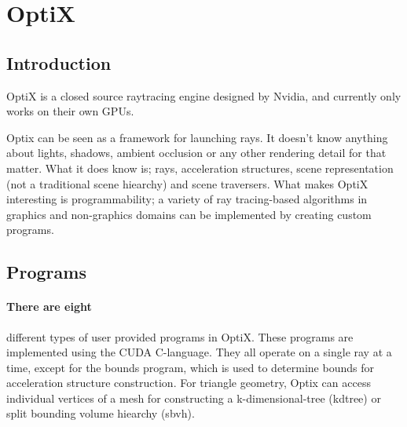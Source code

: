 \section{OptiX}

\subsection{Introduction}
OptiX is a closed source raytracing engine designed by Nvidia, and currently only works on their own GPUs.

Optix can be seen as a framework for launching rays. It doesn't know anything about lights, shadows, ambient occlusion or any other rendering detail for that matter. What it does know is; rays, acceleration structures, scene representation (not a traditional scene hiearchy) and scene traversers. What makes OptiX interesting is programmability; a variety of ray tracing-based algorithms in graphics and non-graphics domains can be implemented \cite{Parker10OptiX} by creating custom programs.

\subsection{Programs}
\paragraph{There are eight} different types of user provided programs in OptiX. These programs are implemented using the CUDA C-language. They all operate on a single ray at a time, except for the bounds program, which is used to determine bounds for acceleration structure construction. For triangle geometry, Optix can access individual vertices of a mesh for constructing a k-dimensional-tree (kdtree) or split bounding volume hiearchy (sbvh).

